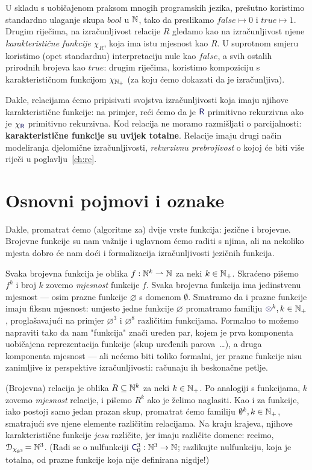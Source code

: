 U skladu s uobičajenom praksom mnogih programskih jezika, prešutno koristimo standardno ulaganje skupa $bool$ u ${\mathbb N}$, tako da preslikamo $\mathit{false}\mapsto 0$ i $\mathit{true}\mapsto 1$. Drugim riječima, na izračunljivost relacije $R$ gledamo kao na izračunljivost njene \emph{karakteristične funkcije} $\chi_R$, koja ima istu mjesnost kao $R$. U suprotnom smjeru koristimo (opet standardnu) interpretaciju nule kao $\mathit{false}$, a svih ostalih prirodnih brojeva kao $\mathit{true}$: drugim riječima, koristimo kompoziciju s karakterističnom funkcijom $\chi_{{\mathbb N}_+}$ (za koju ćemo dokazati da je izračunljiva).

Dakle, relacijama ćemo pripisivati svojstva izračunljivosti koja imaju njihove karakteristične funkcije: na primjer, reći ćemo da je $\f{R}$ primitivno rekurzivna ako je $\chi_{\f{R}}$ primitivno rekurzivna. Kod relacija ne moramo razmišljati o parcijalnosti: \textbf{karakteristične funkcije su uvijek totalne}. Relacije imaju drugi način modeliranja djelomične izračunljivosti, \emph{rekurzivnu prebrojivost} o kojoj će biti više riječi u poglavlju~\ref{ch:re}.

\section{Osnovni pojmovi i oznake}

Dakle, promatrat ćemo (algoritme za) dvije vrste funkcija: jezične i brojevne. Brojevne funkcije su nam važnije i uglavnom ćemo raditi s njima, ali na nekoliko mjesta dobro će nam doći i formalizacija izračunljivosti jezičnih funkcija.

Svaka brojevna funkcija je oblika $f:{\mathbb N}^k\rightharpoonup{\mathbb N}$ za neki $k\in{\mathbb N}_+$. Skraćeno pišemo $f^k$ i broj $k$ zovemo \emph{mjesnost} funkcije $f$. Svaka brojevna funkcija ima jedinstvenu mjesnost --- osim prazne funkcije $\varnothing$ s domenom $\emptyset$. Smatramo da i prazne funkcije imaju fiksnu mjesnost: umjesto jedne funkcije $\varnothing$ promatramo familiju $\varnothing^k,k\in\N_+$, proglašavajući na primjer $\varnothing^3$ i $\varnothing^8$ različitim funkcijama. Formalno to možemo napraviti tako da nam "funkcija" znači uređen par, kojem je prva komponenta uobičajena reprezentacija funkcije (skup uređenih parova~\ldots), a druga komponenta mjesnost --- ali nećemo biti toliko formalni, jer prazne funkcije nisu zanimljive iz perspektive izračunljivosti: računaju ih beskonačne petlje.

(Brojevna) relacija je oblika $R\subseteq{\mathbb N}^k$ za neki $k\in{\mathbb N}_+$. Po analogiji s funkcijama, $k$ zovemo \emph{mjesnost} relacije, i pišemo $R^k$ ako je želimo naglasiti. Kao i za funkcije, iako postoji samo jedan prazan skup, promatrat ćemo familiju $\emptyset^k,k\in{\mathbb N}_+$, smatrajući sve njene elemente različitim relacijama. Na kraju krajeva, njihove karakteristične funkcije \emph{jesu} različite, jer imaju različite domene: recimo, $\mathcal D_{\chi_{\emptyset^3}}\!={\mathbb N}^3$. (Radi se o nulfunkciji $\f C_0^3:\N^3\to\N$; razlikujte nulfunkciju, koja je totalna, od prazne funkcije koja nije definirana nigdje!)

